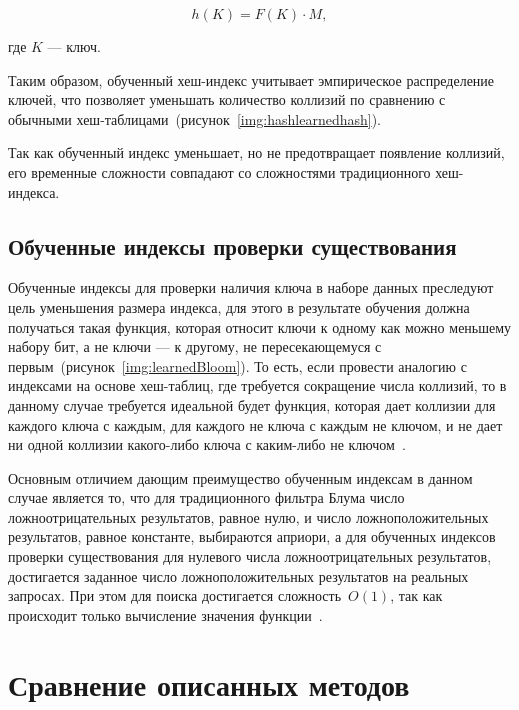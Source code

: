 \begin{equation}\label{eq:06}
    h(K) = F(K) \cdot M,
\end{equation}

где $K$ --- ключ.

Таким образом, обученный хеш-индекс учитывает эмпирическое распределение ключей,
что позволяет уменьшать количество коллизий по сравнению с обычными
хеш-таблицами~(рисунок~\ref{img:hashlearnedhash}).


Так как обученный индекс уменьшает, но не предотвращает появление коллизий, его
временные сложности совпадают со сложностями традиционного хеш-индекса.

\subsection{Обученные индексы проверки существования}

Обученные индексы для проверки наличия ключа в наборе данных преследуют цель
уменьшения размера индекса, для этого в результате обучения должна получаться
такая функция, которая относит ключи к одному как можно меньшему набору бит, а
не ключи --- к другому, не пересекающемуся с
первым~(рисунок~\ref{img:learnedBloom}). То
есть, если провести аналогию с индексами на основе хеш-таблиц, где требуется
сокращение числа коллизий, то в данному случае требуется идеальной будет
функция, которая дает коллизии для каждого ключа с каждым, для каждого не ключа
с каждым не ключом, и не дает ни одной коллизии какого-либо ключа с каким-либо
не ключом~\cite{main}.

Основным отличием дающим преимущество обученным индексам в данном случае
является то, что для традиционного фильтра Блума число ложноотрицательных
результатов, равное нулю, и число ложноположительных результатов, равное
константе, выбираются априори, а для обученных индексов проверки существования
для нулевого числа ложноотрицательных результатов, достигается заданное число
ложноположительных результатов на реальных запросах. При этом для поиска
достигается сложность~$O(1)$, так как происходит только вычисление значения
функции~\cite{main}.



\section{Сравнение описанных методов\label{classification}}

